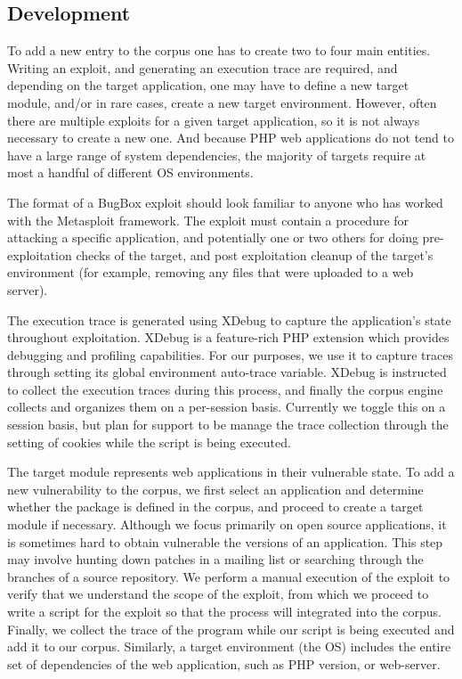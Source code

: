 \documentclass[letterpaper,twocolumn,10pt]{article}
\begin{document}
\subsection{Development}

To add a new entry to the corpus one has to create two to four main entities. Writing an exploit, and generating an execution trace are required, and depending on the target application, one may have to define a new target module, and/or in rare cases, create a new target environment. However, often there are multiple exploits for a given target application, so it is not always necessary to create a new one. And because PHP web applications do not tend to have a large range of system dependencies, the majority of targets require at most a handful of different OS environments. \par
The format of a BugBox exploit should look familiar to anyone who has worked with the Metasploit framework. The exploit must contain a procedure for attacking a specific application, and potentially one or two others for doing pre-exploitation checks of the target, and post exploitation cleanup of the target's environment (for example, removing any files that were uploaded to a web server). \par
The execution trace is generated using XDebug to capture the application's state throughout exploitation. XDebug is a feature-rich PHP extension which provides debugging and profiling capabilities.  For our purposes, we use it to capture traces through setting its global environment auto-trace variable. XDebug is instructed to collect the execution traces during this process, and finally the corpus engine collects and organizes them on a per-session basis. Currently we toggle this on a session basis, but plan for support to be manage the trace collection through the setting of cookies while the script is being executed. \par
The target module represents web applications in their vulnerable state. To add a new vulnerability to the corpus, we first select an application and determine whether the package is defined in the corpus, and proceed to create a target module if necessary. Although we focus primarily on open source applications, it is sometimes hard to obtain vulnerable the versions of an application. This step may involve hunting down patches in a mailing list or searching through the branches of a source repository. We perform a manual execution of the exploit to verify that we understand the scope of the exploit, from which we proceed to write a script for the exploit so that the process will integrated into the corpus. Finally, we collect the trace of the program while our script is being executed and add it to our corpus. Similarly, a target environment (the OS) includes the entire set of dependencies of the web application, such as PHP version, or web-server.\par
\end{document}

